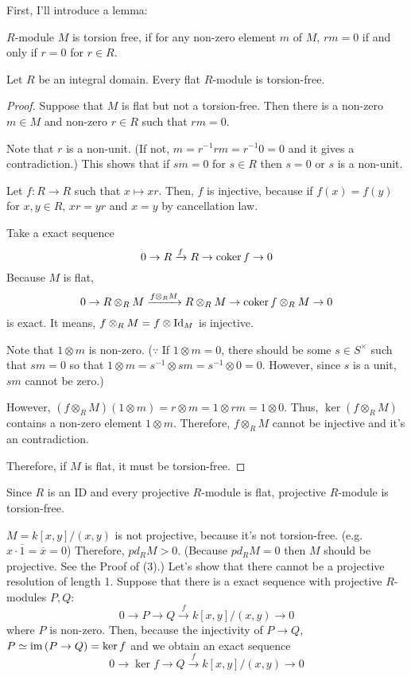 First, I'll introduce a lemma:
\begin{definition}
  \(R\)-module \(M\) is torsion free,
  if for any non-zero element \(m\) of \(M\),
  \(rm = 0\) if and only if \(r = 0\) for \(r \in R\).
\end{definition}
\begin{lemma}
  Let \(R\) be an integral domain.
  Every flat \(R\)-module is torsion-free.
\end{lemma}
\begin{proof}
  Suppose that \(M\) is flat but not a torsion-free.
  Then there is a non-zero \(m \in M\) and non-zero \(r \in R\)
  such that \(rm = 0\).

  Note that \(r\) is a non-unit.
  (If not, \(m = r^{-1}rm = r^{-1} 0 = 0\) and it gives a contradiction.)
  This shows that
  if \(sm = 0\) for \(s \in R\)
  then \(s = 0\) or \(s\) is a non-unit.

  Let \(f: R \to R\) such that \(x \mapsto xr\).
  Then, \(f\) is injective, because
  if \(f(x) = f(y)\) for \(x, y \in R\),
  \(xr = yr\) and \(x = y\) by cancellation law.

  Take a exact sequence
  \[0 \to R \xrightarrow{f} R \to \textnormal{coker}\, f \to 0\]
  Because \(M\) is flat,
  \[0 \to R \otimes_R M \xrightarrow{f \otimes_R M} R \otimes_R M \to \textnormal{coker}\, f \otimes_R M \to 0\]
  is exact.
  It means, \(f \otimes_R M = f \otimes \textnormal{Id}_M\) is injective.

  Note that \(1 \otimes m\) is non-zero.
  (\(\because\)
  If \(1 \otimes m = 0\), there should be some \(s \in S^\times\)
  such that \(sm = 0\)
  so that \(1 \otimes m = s^{-1} \otimes sm = s^{-1} \otimes 0 = 0\).
  However, since \(s\) is a unit, \(sm\) cannot be zero.)

  However, \((f \otimes_R M)(1 \otimes m) = r \otimes m = 1 \otimes rm = 1 \otimes 0\).
  Thus, \(\ker (f \otimes_R M)\) contains a non-zero element \(1 \otimes m\).
  Therefore, \(f \otimes_R M\) cannot be injective
  and it's an contradiction.

  Therefore, if \(M\) is flat, it must be torsion-free.
\end{proof}

Since \(R\) is an ID and every projective \(R\)-module is flat,
projective \(R\)-module is torsion-free.

\(M = k[x, y] / (x, y)\) is not projective,
because it's not torsion-free.
(e.g. \(x \cdot \overline{1} = \overline{x} = 0\))
Therefore, \(pd_R M > 0\).
(Because \(pd_R M = 0\) then \(M\) should be projective.
See the Proof of (3).)
\br
\noindent
Let's show that there cannot be a projective resolution of length 1.
Suppose that there is a exact sequence with projective \(R\)-modules \(P, Q\):
\[0 \to P \to Q \xrightarrow{f} k[x, y] / (x, y) \to 0\]
where \(P\) is non-zero.
Then, because the injectivity of \(P \to Q\),
\(P \simeq \textnormal{im}\, (P \to Q) = \ker f\) and we obtain an exact sequence
\[0 \to \ker f \to Q \xrightarrow{f} k[x, y] / (x, y) \to 0\]

